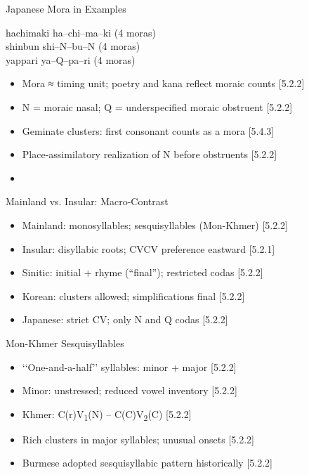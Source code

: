 \documentclass{beamer}
\newcommand{\booksrc}[1]{\hfill {\tiny [#1]}}
\begin{document}
\begin{frame}{Japanese Mora in Examples}
\begin{exe}
\ex hachimaki \quad ha--chi--ma--ki (4 moras) \\
\ex shinbun \quad shi--N--bu--N (4 moras) \\
\ex yappari \quad ya--Q--pa--ri (4 moras)
\end{exe}
\begin{itemize}
\item Mora ≈ timing unit; poetry and kana reflect moraic counts \booksrc{5.2.2}
\item N = moraic nasal; Q = underspecified moraic obstruent \booksrc{5.2.2}
\item Geminate clusters: first consonant counts as a mora \booksrc{5.4.3}
\item Place-assimilatory realization of N before obstruents \booksrc{5.2.2}
\item %
\end{itemize}
\end{frame}


\begin{frame}{Mainland vs. Insular: Macro-Contrast}
\begin{itemize}
\item Mainland: monosyllables; sesquisyllables (Mon-Khmer) \booksrc{5.2.2}
\item Insular: disyllabic roots; CVCV preference eastward \booksrc{5.2.1}
\item Sinitic: initial + rhyme (“final”); restricted codas \booksrc{5.2.2}
\item Korean: clusters allowed; simplifications final \booksrc{5.2.2}
\item Japanese: strict CV; only N and Q codas \booksrc{5.2.2}
\end{itemize}
\end{frame}

\begin{frame}{Mon-Khmer Sesquisyllables}
\begin{itemize}
\item ‘‘One-and-a-half’’ syllables: minor + major \booksrc{5.2.2}
\item Minor: unstressed; reduced vowel inventory \booksrc{5.2.2}
\item Khmer: C(r)V\textsubscript{1}(N) – C(C)V\textsubscript{2}(C) \booksrc{5.2.2}
\item Rich clusters in major syllables; unusual onsets \booksrc{5.2.2}
\item Burmese adopted sesquisyllabic pattern historically \booksrc{5.2.2}
\end{itemize}
\end{frame}
\end{document}
